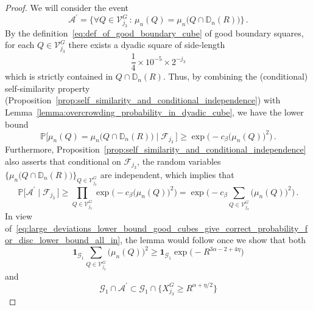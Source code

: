 \documentclass[11pt]{amsart}
\theoremstyle{definition}
\theoremstyle{remark}
\numberwithin{equation}{section}
\newcommand{\bD}{\mathbb D}
\newcommand{\bP}{\mathbb P}
\begin{document}
	\begin{proof}
		We will consider the event
		\begin{equation*}
			\mathcal{A}^\prime = \Big\{ \forall Q\in \mathcal{V}_{j_3}^{G} \, : \, \mu_n(Q) = \mu_n\big(Q\cap \bD_{n}(R)\big) \Big\}\, .
		\end{equation*}
		By the definition~\eqref{eq:def_of_good_boundary_cube} of good boundary squares, for each $Q\in \mathcal{V}_{j_3}^{G}$ there exists a dyadic square of side-length $$\frac{1}{4} \times 10^{-5} \times 2^{-j_3}$$ which is strictly contained in $Q \cap  \bD_n(R)$. Thus, by combining the (conditional) self-similarity property (Proposition~\ref{prop:self_similarity_and_conditional_independence}) with Lemma~\ref{lemma:overcrowding_probability_in_dyadic_cube}, we have the lower bound
		\begin{equation*}
			\bP\Big[ \mu_n(Q) = \mu_n\big(Q\cap \bD_{n}(R)\big) \mid \mathcal{F}_{j_3} \, \Big] \ge \exp\Big(-c_\beta \big(\mu_n(Q)\big)^2\Big) \, .
		\end{equation*}
		Furthermore, Proposition~\ref{prop:self_similarity_and_conditional_independence} also asserts that conditional on $\mathcal{F}_{j_3}$, the random variables $\big\{\mu_n\big(Q\cap \bD_n(R)\big)\big\}_{Q\in \mathcal{V}_{j_3}^{G}}$ are independent, which implies that
		\begin{equation}
			\label{eq:large_deviations_lower_bound_good_cubes_give_correct_probability_for_disc_lower_bound_all_in}
			\bP\big[\mathcal{A}^\prime \mid \mathcal{F}_{j_3} \, \big] \ge \prod_{Q\in \mathcal{V}_{j_3}^{G}} \exp\Big(-c_\beta \big(\mu_n(Q)\big)^2\Big) = \exp\Big(-c_\beta \sum_{Q\in \mathcal{V}_{j_3}^{G}}\big(\mu_n(Q)\big)^2\Big) \, .
		\end{equation}
		In view of~\eqref{eq:large_deviations_lower_bound_good_cubes_give_correct_probability_for_disc_lower_bound_all_in}, the lemma would follow once we show that both
		\begin{equation}
			\label{eq:large_deviations_lower_bound_good_cubes_give_correct_probability_for_disc_lower_bound_sum_of_squares}
			\mathbf{1}_{\mathcal{G}_1} \sum_{Q\in \mathcal{V}_{j_3}^{G}}\big(\mu_n(Q)\big)^2 \ge \mathbf{1}_{\mathcal{G}_1}  \exp\Big(-R^{3\alpha-2 + 4\eta}\Big)
		\end{equation}
		and
		\begin{equation}
			\label{eq:large_deviations_lower_bound_good_cubes_give_correct_probability_for_disc_inclusion_of_events}
			\mathcal{G}_1 \cap \mathcal{A}^\prime \subset \mathcal{G}_1 \cap \Big\{X_{j_3}^G \ge R^{\alpha+\eta/2}  \Big\}

\end{equation}
\end{proof}
\end{document}
